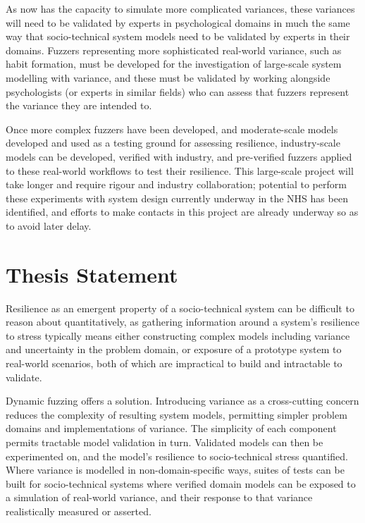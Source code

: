 \documentclass{article}
\begin{document}
As \pdsf{} now has the capacity to simulate more complicated variances, these
variances will need to be validated by experts in psychological domains in much
the same way that socio-technical system models need to be validated by experts
in their domains. Fuzzers representing more sophisticated real-world variance,
such as habit formation, must be developed for the investigation of large-scale
system modelling with variance, and these must be validated by working alongside
psychologists (or experts in similar fields) who can assess that fuzzers
represent the variance they are intended to.\par


Once more complex fuzzers have been developed, and moderate-scale models
developed and used as a testing ground for assessing resilience, industry-scale
models can be developed, verified with industry, and pre-verified fuzzers
applied to these real-world workflows to test their resilience. This large-scale
project will take longer and require rigour and industry collaboration;
potential to perform these experiments with system design currently underway in
the NHS has been identified, and efforts to make contacts in this project are
already underway so as to avoid later delay.\par



\section{Thesis Statement}
\label{sec:thsis_statement}
Resilience as an emergent property of a socio-technical system can be difficult
to reason about quantitatively, as gathering information around a system's
resilience to stress typically means either constructing complex models
including variance and uncertainty in the problem domain, or exposure of a
prototype system to real-world scenarios, both of which are impractical to build
and intractable to validate.\par

Dynamic fuzzing offers a solution. Introducing variance as a cross-cutting
concern reduces the complexity of resulting system models, permitting simpler
problem domains and implementations of variance. The simplicity of each
component permits tractable model validation in turn. Validated models can then
be experimented on, and the model's resilience to socio-technical stress
quantified. Where variance is modelled in non-domain-specific ways, suites of
tests can be built for socio-technical systems where verified domain models can
be exposed to a simulation of real-world variance, and their response to that
variance realistically measured or asserted.\par
\end{document}

